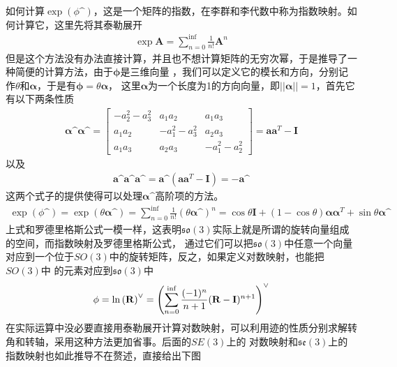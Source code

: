 \documentclass[10pt]{article}
\begin{document}
如何计算$\exp(\phi\sphat)$，这是一个矩阵的指数，在李群和李代数中称为指数映射。如何计算它，这里先将其泰勒展开
\begin{align} 
    \exp{\mathbf{A}}=\sum_{n=0}^{\inf}\frac{1}{n!}\mathbf{A}^{n}
\end{align}
但是这个方法没有办法直接计算，并且也不想计算矩阵的无穷次幂，于是推导了一种简便的计算方法，由于$\mathbf{\phi}$是三维向量
，我们可以定义它的模长和方向，分别记作$\theta$和$\mathbf{\alpha}$，于是有$\mathbf{\phi}=\theta\mathbf{\alpha}$，
这里$\mathbf{\alpha}$为一个长度为1的方向向量，即$||\mathbf{\alpha}||=1$，首先它有以下两条性质
\begin{align} 
    \mathbf{\alpha}\sphat\mathbf{\alpha}\sphat=\left[\begin{array}{ccc}-a_{2}^{2}-a_{3}^{2} & a_{1}a_{2} & 
    a_{1}a_{3} \\ a_{1}a_{2} & -a_{1}^{2}-a_{3}^{2} & a_{2}a_{3} \\ a_{1}a_{3} & a_{2}a_{3} & -a_{1}^{2}
    -a_{2}^{2} \end{array}\right] = \mathbf{a}\mathbf{a}^{T}-\mathbf{I}
    \end{align}
以及  
\begin{align}  
    \mathbf{a}\sphat\mathbf{a}\sphat\mathbf{a}\sphat=\mathbf{a}\sphat(\mathbf{a}\mathbf{a}^{T}-\mathbf{I})
    =-\mathbf{a}\sphat
\end{align}
这两个式子的提供使得可以处理$\mathbf{\alpha}\sphat$高阶项的方法。
\begin{align} 
    \exp(\phi\sphat)=\exp(\theta\mathbf{\alpha}\sphat)=\sum_{n=0}^{\inf}\frac{1}{n!}(\theta\mathbf{\alpha}
    \sphat)^{n}=\cos{\theta\mathbf{I}}+(1-\cos\theta)\mathbf{\alpha}\mathbf{\alpha}^{T}+\sin\theta 
    \mathbf{\alpha}\sphat
\end{align}
上式和罗德里格斯公式一模一样，这表明$\mathfrak{so}(3)$实际上就是所谓的旋转向量组成的空间，而指数映射及罗德里格斯公式，
通过它们可以把$\mathfrak{so}(3)$中任意一个向量对应到一个位于$SO(3)$中的旋转矩阵，反之，如果定义对数映射，也能把$SO(3)$中
的元素对应到$\mathfrak{so}(3)$中 
\begin{align} 
    \mathbf{\phi}=\ln{(\mathbf{R})}\spcheck=\left(\sum_{n=0}^{\inf}\frac{(-1)^{n}}{n+1}(\mathbf{R}-
    \mathbf{I})^{n+1}\right)\spcheck 
\end{align}
在实际运算中没必要直接用泰勒展开计算对数映射，可以利用迹的性质分别求解转角和转轴，采用这种方法更加省事。后面的$SE(3)$上的
对数映射和$\mathfrak{se}(3)$上的指数映射也如此推导不在赘述，直接给出下图
\end{document}
